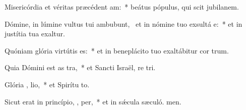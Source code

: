 \item Misericórdia et véritas præcédent  am:~* beátus pópulus, qui scit jubilanem.
\item Dómine, in lúmine vultus tui ambubunt,~\pscross{} et in nómine tuo exsultá  e:~* et in justítia tua exaltur.
\item Quóniam glória virtútis   es:~* et in beneplácito tuo exaltábitur cor trum.
\item Quia Dómini est as tra,~* et Sancti Israël, re tri.
\item Glória ,  lio,~* et Spirítu to.
\item Sicut erat in princípio,  ,  per,~* et in sǽcula sæculó. men.

